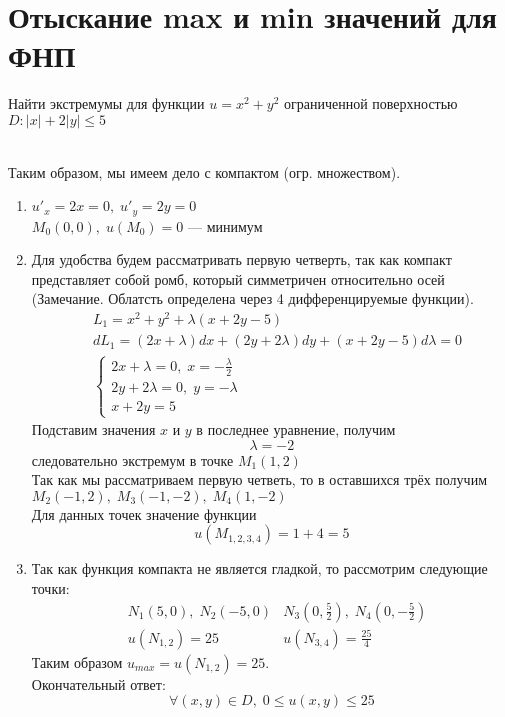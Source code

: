\author{Andrei Tkachuk}

\section{Отыскание max и min значений для ФНП}

\begin{Example}
    Найти экстремумы для функции $u = x^2 + y^2$ ограниченной поверхностью $D: |x|+2|y| \leqslant 5$
    \begin{figure}[h!]
        \noindent{}
    \end{figure}\\
    Таким образом, мы имеем дело с компактом (огр. множеством).
    \begin{enumerate}
        \item $u'_x = 2x = 0, \; u'_y = 2y = 0$\\
              $M_0(0, 0), \; u(M_0) = 0$ --- минимум
        \item Для удобства будем рассматривать первую четверть, так как компакт представляет собой ромб, который симметричен относительно осей (Замечание. Облатсть определена через 4 дифференцируемые функции).
        \begin{align*}
            &L_1 = x^2 + y^2 + \lambda(x + 2y - 5)\\
            &dL_1 = (2x + \lambda)dx + (2y + 2\lambda)dy + (x + 2y - 5)d\lambda = 0\\
            &\begin{cases}
                2x + \lambda = 0, \; x = -\frac{\lambda}{2}\\
                2y + 2\lambda = 0, \; y = -\lambda\\
                x + 2y = 5
            \end{cases}
        \end{align*}
        Подставим значения $x$ и $y$ в последнее уравнение, получим
        \[
            \lambda = -2
        \]
        следовательно экстремум в точке $M_1(1, 2)$\\
        Так как мы рассматриваем первую четветь, то в оставшихся трёх получим $M_2(-1, 2), \; M_3(-1, -2), \; M_4(1, -2)$\\
        Для данных точек значение функции 
        \[
            u(M_{1,2,3,4}) = 1 + 4 = 5
        \]
        \item Так как функция компакта не является гладкой, то рассмотрим следующие точки:
        \begin{align*}
            &N_1(5, 0), \; N_2(-5, 0) &N_3(0, \frac{5}{2}), \; N_4(0, -\frac{5}{2})\\
            &u(N_{1,2}) = 25  &u(N_{3,4}) = \frac{25}{4}
        \end{align*}
        Таким образом $u_{max} = u(N_{1,2}) = 25$.\\
        Окончательный ответ:
        \[
            \forall(x, y) \in D, \; 0 \leqslant u(x, y) \leqslant 25
        \]
    \end{enumerate}
\end{Example}

